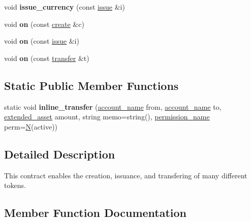 \begin{DoxyCompactItemize}
void {\bfseries issue\+\_\+currency} (const \mbox{\hyperlink{structaacio_1_1currency_1_1issue}{issue}} \&i)
\item 
\mbox{\label{classaacio_1_1currency_a704b45a5d2f8fe7e42a9f99c06356ad7}} 
void {\bfseries on} (const \mbox{\hyperlink{structaacio_1_1currency_1_1create}{create}} \&c)
\item 
\mbox{\label{classaacio_1_1currency_a98d7673c46255ce329f866c45fa67570}} 
void {\bfseries on} (const \mbox{\hyperlink{structaacio_1_1currency_1_1issue}{issue}} \&i)
\item 
\mbox{\label{classaacio_1_1currency_a693d62ace69d867d63fe604a5360cb23}} 
void {\bfseries on} (const \mbox{\hyperlink{structaacio_1_1currency_1_1transfer}{transfer}} \&t)
\end{DoxyCompactItemize}
\subsection*{Static Public Member Functions}
\begin{DoxyCompactItemize}
\item 
\mbox{\label{classaacio_1_1currency_a436e43fe6886a1cd455df14fb18a45bd}} 
static void {\bfseries inline\+\_\+transfer} (\mbox{\hyperlink{structaacio_1_1chain_1_1name}{account\+\_\+name}} from, \mbox{\hyperlink{structaacio_1_1chain_1_1name}{account\+\_\+name}} to, \mbox{\hyperlink{structaacio_1_1extended__asset}{extended\+\_\+asset}} amount, string memo=string(), \mbox{\hyperlink{structaacio_1_1chain_1_1name}{permission\+\_\+name}} perm=\mbox{\hyperlink{group__types_gaf9c1edb0e0da55ec6ba09f32f6839529}{N}}(active))
\end{DoxyCompactItemize}


\subsection{Detailed Description}
This contract enables the creation, issuance, and transfering of many different tokens. 

\subsection{Member Function Documentation}
\mbox{\label{classaacio_1_1currency_a7a7b9ea7a4124b4dc21bd57f383042a5}} 
